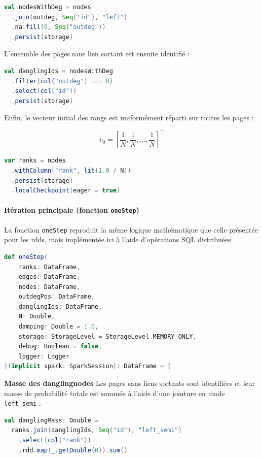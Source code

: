 \documentclass[conference]{IEEEtran}
\begin{document}
\begin{lstlisting}[language=Scala]
val nodesWithDeg = nodes
  .join(outdeg, Seq("id"), "left")
  .na.fill(0, Seq("outdeg"))
  .persist(storage)
\end{lstlisting}

L'ensemble des pages sans lien sortant est ensuite identifié :

\begin{lstlisting}[language=Scala]
val danglingIds = nodesWithDeg
  .filter(col("outdeg") === 0)
  .select(col("id"))
  .persist(storage)
\end{lstlisting}

Enfin, le vecteur initial des rangs est uniformément réparti sur toutes les pages :

\[
v_0 = \left[ \frac{1}{N}, \frac{1}{N}, \ldots, \frac{1}{N} \right]^{\top}
\]

\begin{lstlisting}[language=Scala]
var ranks = nodes
  .withColumn("rank", lit(1.0 / N))
  .persist(storage)
  .localCheckpoint(eager = true)
\end{lstlisting}

\paragraph{Itération principale (fonction \texttt{oneStep})}

La fonction \texttt{oneStep} reproduit la même logique mathématique que celle présentée pour les \glspl{rdd}, mais implémentée ici à l'aide d'opérations SQL distribuées.  

\begin{lstlisting}[language=Scala]
def oneStep(
    ranks: DataFrame,
    edges: DataFrame,
    nodes: DataFrame,
    outdegPos: DataFrame,
    danglingIds: DataFrame,
    N: Double,
    damping: Double = 1.0,
    storage: StorageLevel = StorageLevel.MEMORY_ONLY,
    debug: Boolean = false,
    logger: Logger
)(implicit spark: SparkSession): DataFrame = {
\end{lstlisting}

\textbf{Masse des \glspl{danglingnode}}  
Les pages sans liens sortants sont identifiées et leur masse de probabilité totale est sommée à l'aide d'une jointure en mode \texttt{left\_semi} :

\begin{lstlisting}[language=Scala]
val danglingMass: Double =
  ranks.join(danglingIds, Seq("id"), "left_semi")
    .select(col("rank"))
    .rdd.map(_.getDouble(0)).sum()
\end{lstlisting}
\end{document}
